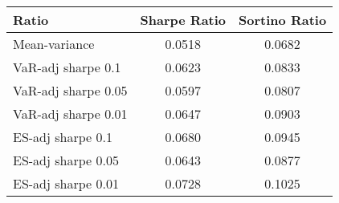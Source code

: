\begin{tabular}{lcc}
\toprule
Ratio & Sharpe Ratio & Sortino Ratio\\
\midrule
Mean-variance & 0.0518 & 0.0682\\
VaR-adj sharpe 0.1 & 0.0623 & 0.0833\\
VaR-adj sharpe 0.05 & 0.0597 & 0.0807\\
VaR-adj sharpe 0.01 & 0.0647 & 0.0903\\
ES-adj sharpe 0.1 & 0.0680 & 0.0945\\
ES-adj sharpe 0.05 & 0.0643 & 0.0877\\
ES-adj sharpe 0.01 & 0.0728 & 0.1025\\
\bottomrule
\end{tabular}
